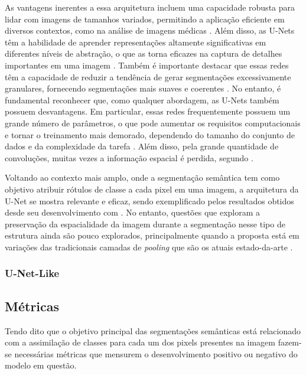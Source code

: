 As vantagens inerentes a essa arquitetura incluem uma capacidade robusta para lidar com imagens de tamanhos variados, permitindo a aplicação eficiente em diversos contextos, como na análise de imagens médicas \citep{Ronneberger2015U-net:Segmentation}. Além disso, as U-Nets têm a habilidade de aprender representações altamente significativas em diferentes níveis de abstração, o que as torna eficazes na captura de detalhes importantes em uma imagem \citep{Alom2019RecurrentSegmentation}. Também é importante destacar que essas redes têm a capacidade de reduzir a tendência de gerar segmentações excessivamente granulares, fornecendo segmentações mais suaves e coerentes \citep{Du2020MedicalReview}. No entanto, é fundamental reconhecer que, como qualquer abordagem, as U-Nets também possuem desvantagens. Em particular, essas redes frequentemente possuem um grande número de parâmetros, o que pode aumentar os requisitos computacionais e tornar o treinamento mais demorado, dependendo do tamanho do conjunto de dados e da complexidade da tarefa \citep{Ronneberger2015U-net:Segmentation}. Além disso, pela grande quantidade de convoluções, muitas vezes a informação espacial é perdida, segundo \cite{Zhang2023LcmUNet:Segmentation}.

Voltando ao contexto mais amplo, onde a segmentação semântica tem como objetivo atribuir rótulos de classe a cada pixel em uma imagem, a arquitetura da U-Net se mostra relevante e eficaz, sendo exemplificado pelos resultados obtidos desde seu desenvolvimento com \cite{Ronneberger2015U-net:Segmentation}. No entanto, questões que exploram a preservação da espacialidade da imagem durante a segmentação nesse tipo de estrutura ainda são pouco explorados, principalmente quando a proposta está em variações das tradicionais camadas de \textit{pooling} que são os atuais estado-da-arte \citep{Minaee2021}.

\subsubsection{U-Net-Like}


\subsection{Métricas}
\label{semantic:metrics}
Tendo dito que o objetivo principal das segmentações semânticas está relacionado com a assimilação de classes para cada um dos pixels presentes na imagem \cite{Csurka2013} fazem-se necessárias métricas que mensurem o desenvolvimento positivo ou negativo do modelo em questão.

